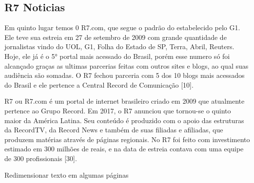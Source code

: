 \documentclass[a4paper]{article}
\begin{document}
\begin{titlepage}
\subsection{R7 Noticias}

Em quinto lugar temos 0 R7.com, que segue o padrão do estabelecido pelo G1. Ele teve sua estreia em 27 de setembro de 2009 com grande quantidade de jornalistas vindo do UOL, G1, Folha do Estado de SP, Terra, Abril, Reuters. Hoje, ele já é o 5° portal mais acessado do Brasil, porém esse numero só foi alcançado graças as ultimas parcerias feitas com outros sites e blogs, ao qual suas audiência são somadas. O R7 fechou parceria com 5 dos 10 blogs mais acessados do Brasil e ele pertence a Central Record de Comunicação [10].

R7 ou R7.com é um portal de internet brasileiro criado em 2009 que atualmente pertence ao Grupo Record. Em 2017, o R7 anunciou que tornou-se o quinto maior da América Latina. Seu conteúdo é produzido com o apoio das estruturas da RecordTV, da Record News e também de suas filiadas e afiliadas, que produzem matérias através de páginas regionais. No R7 foi feito com investimento estimado em 300 milhões de reais, e na data de estreia contava com uma equipe de 300 profissionais [30].

Redimensionar texto em algumas páginas


\end{titlepage}
\end{document}

